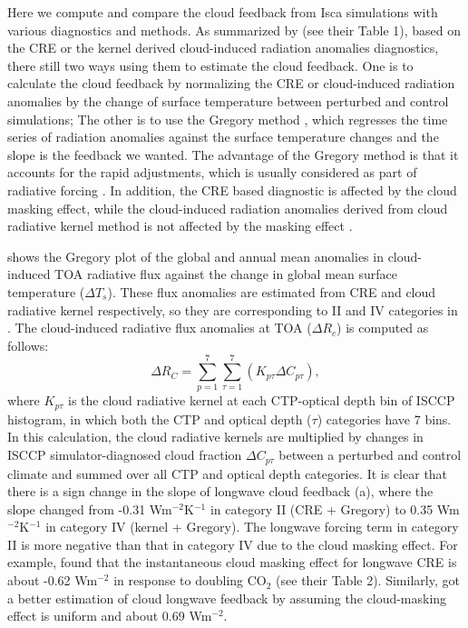 Here we compute and compare the cloud feedback from Isca simulations with various diagnostics and methods. As summarized by \cite{Zelinka2013} (see their Table 1), based on the CRE or the kernel derived cloud-induced radiation anomalies diagnostics, there still two ways using them to estimate the cloud feedback. One is to calculate the cloud feedback by normalizing the CRE or cloud-induced radiation anomalies by the change of surface temperature between perturbed and control simulations; The other is to use the Gregory method \citep{Gregory2004}, which regresses the time series of radiation anomalies against the surface temperature changes and the slope is the feedback we wanted. The advantage of the Gregory method is that it accounts for the rapid adjustments, which is usually considered as part of radiative forcing \citep{Andrews2012cloud,Siebesma2020clouds}. In addition, the CRE based diagnostic is affected by the cloud masking effect, while the cloud-induced radiation anomalies derived from cloud radiative kernel method is not affected by the masking effect \citep{Zelinka2013}.

 shows the Gregory plot of the global and annual mean anomalies in cloud-induced TOA radiative flux against the change in global mean surface temperature ($\Delta T_s$). These flux anomalies are estimated from CRE and cloud radiative kernel respectively, so they are corresponding to II and IV categories in . The cloud-induced radiative flux anomalies at TOA ($\Delta R_c$) is computed as follows:
\begin{equation}
    \Delta R_{C}=\sum_{p=1}^{7} \sum_{\tau=1}^{7}\left(K_{p \tau} \Delta C_{p \tau}\right),
\end{equation}
where $K_{p\tau}$ is the cloud radiative kernel at each CTP-optical depth bin of ISCCP histogram, in which both the CTP and optical depth ($\tau$) categories have 7 bins. In this calculation, the cloud radiative kernels are multiplied by changes in ISCCP simulator-diagnosed cloud fraction $\Delta C_{p\tau}$ between a perturbed and control climate and summed over all CTP and optical depth categories. It is clear that there is a sign change in the slope of longwave cloud feedback (a), where the slope changed from -0.31 Wm$^{-2}$K$^{-1}$ in category II (CRE + Gregory) to 0.35 Wm$^{-2}$K$^{-1}$ in category IV (kernel + Gregory). The longwave forcing term in category II is more negative than that in category IV due to the cloud masking effect. For example, \cite{Andrews2012cloud} found that the instantaneous cloud masking effect for longwave CRE is about -0.62 Wm$^{-2}$ in response to doubling CO$_2$ (see their Table 2). Similarly, \cite{Soden2004} got a better estimation of cloud longwave feedback by assuming the cloud-masking effect is uniform and about 0.69 Wm$^{-2}$.

